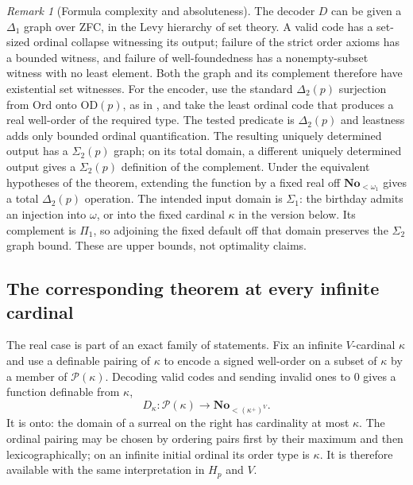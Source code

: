 \documentclass[11pt,a4paper]{article}
\numberwithin{equation}{section}
\theoremstyle{definition}
\theoremstyle{remark}
\newtheorem{remark}[remark]{Remark}
\newcommand{\No}{\mathbf{No}}
\newcommand{\Ord}{\mathrm{Ord}}
\newcommand{\OD}{\mathrm{OD}}
\begin{document}
\begin{remark}[Formula complexity and absoluteness]
The decoder $D$ can be given a $\Delta_1$ graph over ZFC, in the
Levy hierarchy of set theory.  A valid
code has a set-sized ordinal collapse witnessing its output; failure
of the strict order axioms has a bounded witness, and failure of
well-foundedness has a nonempty-subset witness with no least element.
Both the graph and its complement therefore have existential set
witnesses.  For the encoder, use the standard $\Delta_2(p)$ surjection
from $\Ord$ onto $\OD(p)$, as in
\cite[Section 4]{DoraisHamkins}, and take the least ordinal code
that produces a real well-order of the required type.  The tested
predicate is $\Delta_2(p)$ and leastness adds only bounded ordinal
quantification.  The resulting uniquely determined output has a
$\Sigma_2(p)$ graph; on its total domain, a different uniquely
determined output gives a $\Sigma_2(p)$ definition of the complement.
Under the equivalent hypotheses of the theorem, extending the
function by a fixed real off $\No_{<\omega_1}$ gives a total
$\Delta_2(p)$ operation.  The intended input domain is $\Sigma_1$:
the birthday admits an injection into $\omega$, or into the fixed
cardinal $\kappa$ in the version below.  Its complement is $\Pi_1$,
so adjoining the fixed default off that domain preserves the
$\Sigma_2$ graph bound.  These are upper bounds, not optimality claims.
\end{remark}

\subsection{The corresponding theorem at every infinite cardinal}

The real case is part of an exact family of statements.  Fix an infinite
$V$-cardinal $\kappa$ and use a definable pairing of $\kappa$ to encode
a signed well-order on a subset of $\kappa$ by a member of
$\mathcal P(\kappa)$.  Decoding valid codes and sending invalid ones to
$0$ gives a function definable from $\kappa$,
\[
 D_\kappa:\mathcal P(\kappa)\longrightarrow
            \No_{<(\kappa^+)^V}.
\]
It is onto: the domain of a surreal on the right has cardinality at most
$\kappa$.  The ordinal pairing may be chosen by ordering pairs first by
their maximum and then lexicographically; on an infinite initial
ordinal its order type is $\kappa$.  It is therefore available with the
same interpretation in $H_p$ and $V$.
\end{document}
